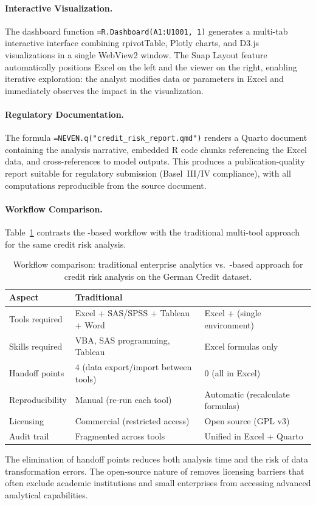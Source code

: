 \paragraph{Interactive Visualization.}
The dashboard function \texttt{=R.Dashboard(A1:U1001, 1)} generates a multi-tab interactive interface combining rpivotTable, Plotly charts, and D3.js visualizations in a single WebView2 window. The Snap Layout feature automatically positions Excel on the left and the viewer on the right, enabling iterative exploration: the analyst modifies data or parameters in Excel and immediately observes the impact in the visualization.

\paragraph{Regulatory Documentation.}
The formula \texttt{=NEVEN.q("credit\_risk\_report.qmd")} renders a Quarto document containing the analysis narrative, embedded R code chunks referencing the Excel data, and cross-references to model outputs. This produces a publication-quality report suitable for regulatory submission (Basel~III/IV compliance), with all computations reproducible from the source document.

\paragraph{Workflow Comparison.}
Table~\ref{tab:enterprise_comparison} contrasts the \neven{}-based workflow with the traditional multi-tool approach for the same credit risk analysis.

\begin{table}[htbp]
\centering
\caption{Workflow comparison: traditional enterprise analytics vs.\ \neven{}-based approach for credit risk analysis on the German Credit dataset.}
\label{tab:enterprise_comparison}
\begin{tabular}{@{}lp{4.5cm}p{4.5cm}@{}}
\toprule
\textbf{Aspect} & \textbf{Traditional} & \textbf{\neven{}} \\
\midrule
Tools required & Excel + SAS/SPSS + Tableau + Word & Excel + \neven{} (single environment) \\
\addlinespace
Skills required & VBA, SAS programming, Tableau & Excel formulas only \\
\addlinespace
Handoff points & 4 (data export/import between tools) & 0 (all in Excel) \\
\addlinespace
Reproducibility & Manual (re-run each tool) & Automatic (recalculate formulas) \\
\addlinespace
Licensing & Commercial (restricted access) & Open source (GPL v3) \\
\addlinespace
Audit trail & Fragmented across tools & Unified in Excel + Quarto \\
\bottomrule
\end{tabular}
\end{table}

The elimination of handoff points reduces both analysis time and the risk of data transformation errors. The open-source nature of \neven{} removes licensing barriers that often exclude academic institutions and small enterprises from accessing advanced analytical capabilities.
